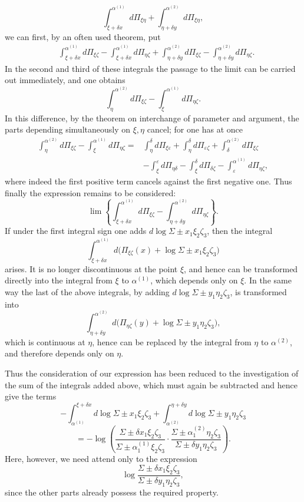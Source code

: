 \documentclass[10pt]{article}
\begin{document}
\[
\int_{\xi+\delta x}^{\alpha^{(1)}}d\Pi_{\xi\eta}
+\int_{\eta+\delta y}^{\alpha^{(2)}}d\Pi_{\xi\eta},
\]
we can first, by an often used theorem, put
\[
\begin{aligned}
&\int_{\xi+\delta x}^{\alpha^{(1)}}d\Pi_{\xi\zeta}
-\int_{\xi+\delta x}^{\alpha^{(1)}}d\Pi_{\eta\zeta}
+\int_{\eta+\delta y}^{\alpha^{(2)}}d\Pi_{\xi\zeta}
-\int_{\eta+\delta y}^{\alpha^{(2)}}d\Pi_{\eta\zeta}.
\end{aligned}
\]
In the second and third of these integrals the passage to the limit can be carried out immediately, and one obtains
\[
\int_{\eta}^{\alpha^{(2)}}d\Pi_{\xi\zeta}-\int_{\xi}^{\alpha^{(1)}}d\Pi_{\eta\zeta}.
\]
In this difference, by the theorem on interchange of parameter and argument, the parts depending simultaneously on \(\xi,\eta\) cancel; for one has at once
\[
\begin{aligned}
\int_{\eta}^{\alpha^{(2)}}d\Pi_{\xi\zeta}-\int_{\xi}^{\alpha^{(1)}}d\Pi_{\eta\zeta}
={}&\int_{\eta}^{\delta}d\Pi_{\xi\varepsilon}
+\int_{\eta}^{\delta}d\Pi_{\varepsilon\zeta}
+\int_{\delta}^{\alpha^{(2)}}d\Pi_{\xi\zeta}\\
&-\int_{\xi}^{\varepsilon}d\Pi_{\eta\delta}
-\int_{\xi}^{\delta}d\Pi_{\delta\zeta}
-\int_{\varepsilon}^{\alpha^{(1)}}d\Pi_{\eta\zeta},
\end{aligned}
\]
where indeed the first positive term cancels against the first negative one. Thus finally the expression remains to be considered:
\[
\lim\left\{\int_{\xi+\delta x}^{\alpha^{(1)}}d\Pi_{\xi\zeta}
-\int_{\eta+\delta y}^{\alpha^{(2)}}d\Pi_{\eta\zeta}\right\}.
\]
If under the first integral sign one adds \(d\log\Sigma\pm x_1\xi_2\zeta_3\), then the integral
\[
\int_{\xi+\delta x}^{\alpha^{(1)}}d\bigl(\Pi_{\xi\zeta}(x)+\log\Sigma\pm x_1\xi_2\zeta_3\bigr)
\]
arises. It is no longer discontinuous at the point \(\xi\), and hence can be transformed directly into the integral from \(\xi\) to \(\alpha^{(1)}\), which depends only on \(\xi\). In the same way the last of the above integrals, by adding \(d\log\Sigma\pm y_1\eta_2\zeta_3\), is transformed into
\[
\int_{\eta+\delta y}^{\alpha^{(2)}}d\bigl(\Pi_{\eta\zeta}(y)+\log\Sigma\pm y_1\eta_2\zeta_3\bigr),
\]
which is continuous at \(\eta\), hence can be replaced by the integral from \(\eta\) to \(\alpha^{(2)}\), and therefore depends only on \(\eta\).

Thus the consideration of our expression has been reduced to the investigation of the sum of the integrals added above, which must again be subtracted and hence give the terms
\[
-\int_{\alpha^{(1)}}^{\xi+\delta x}d\log\Sigma\pm x_1\xi_2\zeta_3
+\int_{\alpha^{(2)}}^{\eta+\delta y}d\log\Sigma\pm y_1\eta_2\zeta_3
\]
\[
=-\log\left(\frac{\Sigma\pm\delta x_1\xi_2\zeta_3}{\Sigma\pm\alpha_1^{(1)}\xi_2\zeta_3}\cdot
\frac{\Sigma\pm\alpha_1^{(2)}\eta_2\zeta_3}{\Sigma\pm\delta y_1\eta_2\zeta_3}\right).
\]
Here, however, we need attend only to the expression
\[
\log\frac{\Sigma\pm\delta x_1\xi_2\zeta_3}{\Sigma\pm\delta y_1\eta_2\zeta_3},
\]
since the other parts already possess the required property.
\end{document}
